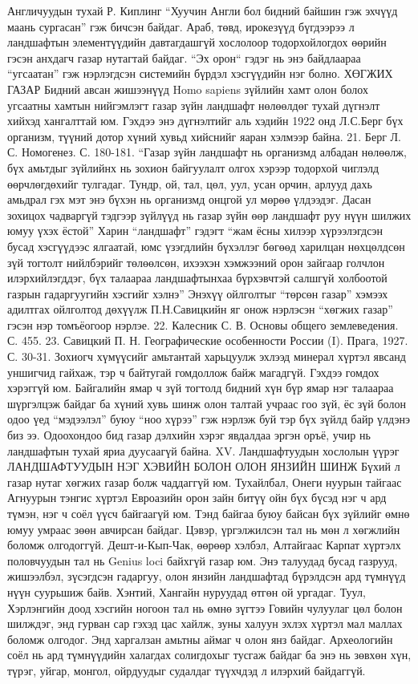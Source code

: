 Англичуудын тухай Р. Киплинг “Хуучин Англи бол бидний байшин гэж эхчүүд маань сургасан” гэж бичсэн байдаг. Араб, төвд, ирокезүүд бүгдээрээ л ландшафтын элементүүдийн давтагдашгүй хослолоор тодорхойлогдох өөрийн гэсэн анхдагч газар нутагтай байдаг. “Эх орон“ гэдэг нь энэ байдлаараа “угсаатан” гэж нэрлэгдсэн системийн бүрдэл хэсгүүдийн нэг болно.
ХӨГЖИХ ГАЗАР
Бидний авсан жишээнүүд Homo sapiens зүйлийн хамт олон болох угсаатны хамтын нийгэмлэгт газар зүйн ландшафт нөлөөлдөг тухай дүгнэлт хийхэд хангалттай юм. Гэхдээ энэ дүгнэлтийг аль хэдийн 1922 онд Л.С.Берг бүх организм, түүний дотор хүний хувьд хийснийг яаран хэлмээр байна. 21. Берг Л. С. Номогенез. С. 180-181.
“Газар зүйн ландшафт нь организмд албадан нөлөөлж, бүх амьтдыг зүйлийнх нь зохион байгуулалт олгох хэрээр тодорхой чиглэлд өөрчлөгдөхийг тулгадаг. Тундр, ой, тал, цөл, уул, усан орчин, арлууд дахь амьдрал гэх мэт энэ бүхэн нь организмд онцгой ул мөрөө үлдээдэг. Дасан зохицох чадваргүй тэдгээр зүйлүүд нь газар зүйн өөр ландшафт руу нүүн шилжих юмуу үхэх ёстой” Харин “ландшафт” гэдэгт “жам ёсны хилээр хүрээлэгдсэн бусад хэсгүүдээс ялгаатай, юмс үзэгдлийн бүхэллэг бөгөөд харилцан нөхцөлдсөн зүй тогтолт нийлбэрийг төлөөлсөн, ихээхэн хэмжээний орон зайгаар голчлон илэрхийлэгддэг, бүх талаараа ландшафтынхаа бүрхэвчтэй салшгүй холбоотой газрын гадаргуугийн хэсгийг хэлнэ” Энэхүү ойлголтыг “төрсөн газар” хэмээх адилтгах ойлголтод дөхүүлж П.Н.Савицкийн яг онож нэрлэсэн “хөгжих газар” гэсэн нэр томъёогоор нэрлэе. 22. Калесник С. В. Основы общего землеведения. С. 455. 23. Савицкий П. Н. Географические особенности России (I). Прага, 1927. С. 30-31.
Зохиогч хүмүүсийг амьтантай харьцуулж эхлээд минерал хүртэл явсанд уншигчид гайхаж, тэр ч байтугай гомдоллож байж магадгүй. Гэхдээ гомдох хэрэггүй юм. Байгалийн ямар ч зүй тогтолд бидний хүн бүр ямар нэг талаараа шүргэлцэж байдаг ба хүний хувь шинж олон талтай учраас гоо зүй, ёс зүй болон одоо үед “мэдээлэл” буюу “ноо хүрээ” гэж нэрлэж буй тэр бүх зүйлд байр үлдэнэ биз ээ. Одоохондоо бид газар дэлхийн хэрэг явдалдаа эргэн оръё, учир нь ландшафтын тухай яриа дуусаагүй байна.
XV. Ландшафтуудын хослолын үүрэг
ЛАНДШАФТУУДЫН НЭГ ХЭВИЙН БОЛОН ОЛОН ЯНЗИЙН ШИНЖ
Бүхий л газар нутаг хөгжих газар болж чаддаггүй юм. Тухайлбал, Онеги нуурын тайгаас Агнуурын тэнгис хүртэл Евроазийн орон зайн битүү ойн бүх бүсэд нэг ч ард түмэн, нэг ч соёл үүсч байгаагүй юм. Тэнд байгаа буюу байсан бүх зүйлийг өмнө юмуу умраас зөөн авчирсан байдаг. Цэвэр, үргэлжилсэн тал нь мөн л хөгжлийн боломж олгодоггүй. Дешт-и-Кып-Чак, өөрөөр хэлбэл, Алтайгаас Карпат хүртэлх половчуудын тал нь Genius loci байхгүй газар юм. Энэ талуудад бусад газрууд, жишээлбэл, зүсэгдсэн гадаргуу, олон янзийн ландшафтад бүрэлдсэн ард түмнүүд нүүн суурьшиж байв. Хэнтий, Хангайн нуруудад өтгөн ой ургадаг. Туул, Хэрлэнгийн доод хэсгийн ногоон тал нь өмнө зүгтээ Говийн чулуулаг цөл болон шилждэг, энд гурван сар гэхэд цас хайлж, зуны халуун эхлэх хүртэл мал маллах боломж олгодог. Энд харгалзан амьтны аймаг ч олон янз байдаг. Археологийн соёл нь ард түмнүүдийн халагдах солигдохыг тусгаж байдаг ба энэ нь зөвхөн хүн, түрэг, уйгар, монгол, ойрдуудыг судалдаг түүхчдэд л илэрхий байдаггүй.
